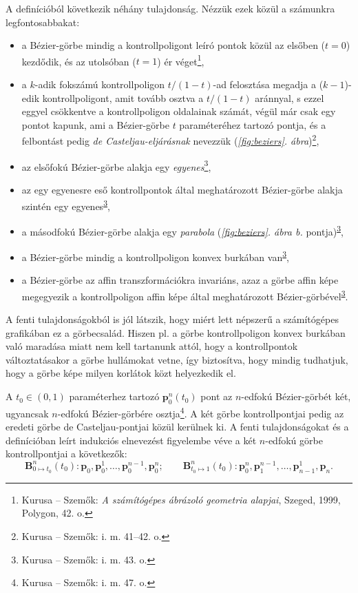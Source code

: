 \documentclass[12pt]{report}
\theoremstyle{definition}
\begin{document}
A definícióból következik néhány tulajdonság. Nézzük ezek közül a számunkra
legfontosabbakat:
\begin{itemize}[noitemsep,topsep=0pt]
  \item a Bézier-görbe mindig a kontrollpoligont leíró pontok közül az elsőben
  ($t=0$) kezdődik, és az utolsóban ($t=1$) ér véget\footnote{Kurusa -- Szemők:
  \emph{A számítógépes ábrázoló geometria alapjai}, Szeged, 1999, Polygon, 42.
  o.},
  \item a $k$-adik fokszámú kontrollpoligon $t/(1-t)$-ad felosztása megadja a
  ($k-1$)-edik kontrollpoligont, amit tovább osztva a $t/(1-t)$ aránnyal, s
  ezzel eggyel csökkentve a kontrollpoligon oldalainak számát, végül már csak
  egy pontot kapunk, ami a Bézier-görbe $t$ paraméteréhez tartozó pontja, és a
  felbontást pedig \emph{de Casteljau-eljárásnak} nevezzük
  (\emph{\ref{fig:beziers}. ábra})\footnote{Kurusa -- Szemők: i. m. 41--42.
  o.},
  \item az elsőfokú Bézier-görbe alakja egy \emph{egyenes}\footnote{Kurusa --
  Szemők: i. m. 43. o.\label{fn:Kurusa:43p}},
  \item az egy egyenesre eső kontrollpontok által meghatározott Bézier-görbe
  alakja szintén egy egyenes\textsuperscript{\ref{fn:Kurusa:43p}},

  \item a másodfokú Bézier-görbe alakja egy \emph{parabola}
  (\emph{\ref{fig:beziers}. ábra b.}
  pontja)\textsuperscript{\ref{fn:Kurusa:43p}},

  \item a Bézier-görbe mindig a kontrollpoligon konvex burkában
  van\textsuperscript{\ref{fn:Kurusa:43p}},

  \item a Bézier-görbe az affin transzformációkra invariáns, azaz a görbe affin
  képe megegyezik a kontrollpoligon affin képe által meghatározott
  Bézier-görbével\textsuperscript{\ref{fn:Kurusa:43p}}.
\end{itemize}

A fenti tulajdonságokból is jól látszik, hogy miért lett népszerű a
számítógépes grafikában ez a görbecsalád. Hiszen pl. a görbe kontrollpoligon
konvex burkában való maradása miatt nem kell tartanunk attól, hogy a
kontrollpontok változtatásakor a görbe hullámokat vetne, így biztosítva, hogy
mindig tudhatjuk, hogy a görbe képe milyen korlátok közt helyezkedik el.

A $t_0 \in (0,1)$ paraméterhez tartozó $\boldsymbol{p}^n_0(t_0)$ pont az
$n$-edfokú Bézier-görbét két, ugyancsak $n$-edfokú Bézier-görbére
osztja\footnote{Kurusa -- Szemők: i. m. 47. o.}. A két görbe kontrollpontjai
pedig az eredeti görbe de Casteljau-pontjai közül kerülnek ki. A fenti
tulajdonságokat és a definícióban leírt indukciós elnevezést figyelembe véve a
két $n$-edfokú görbe kontrollpontjai a következők: \begin{equation}\label{eq:1}
\boldsymbol{B}_{0\mapsto t_0}^n(t_0): \boldsymbol{p}_0, \boldsymbol{p}_0^1,
\dots, \boldsymbol{p}_0^{n-1}, \boldsymbol{p}_0^n; \qquad
\boldsymbol{B}_{t_0\mapsto 1}^n(t_0): \boldsymbol{p}_0^n,
\boldsymbol{p}_1^{n-1}, \dots, \boldsymbol{p}_{n-1}^1, \boldsymbol{p}_n.
\end{equation}
\end{document}
